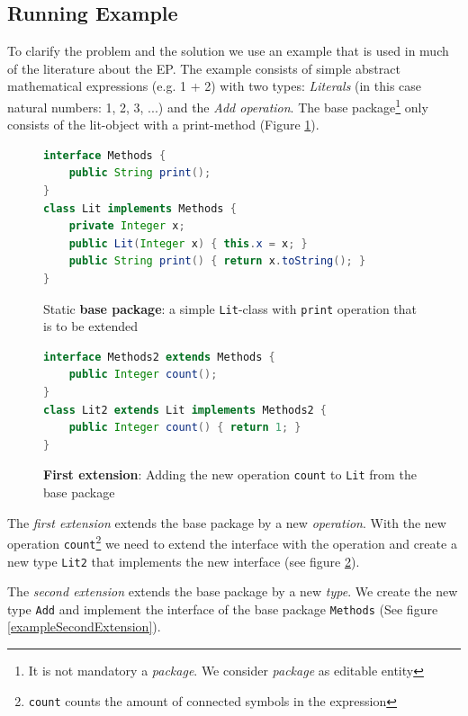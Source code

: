 \documentclass{report}
\begin{document}
\subsection{Running Example}
\label{example}

To clarify the problem and the solution we use an example that is used in much of the literature about the EP. The example consists of simple abstract mathematical expressions (e.g. 1 + 2) with two types: \emph{Literals} (in this case natural numbers: 1, 2, 3, ...) and the \emph{Add operation}. The base package\footnote{It is not mandatory a \emph{package}. We consider \emph{package} as editable entity} only consists of the lit-object with a print-method (Figure \ref{exampleLitBaseClass}).


\begin{figure}[H]
\begin{lstlisting}[language=java]
interface Methods {
    public String print();
}
class Lit implements Methods {
    private Integer x;
    public Lit(Integer x) { this.x = x; }
    public String print() { return x.toString(); }
}
\end{lstlisting}
\caption{Static \textbf{base package}: a simple \lstinline{Lit}-class with \lstinline{print} operation that is to be extended}
\label{exampleLitBaseClass}
\end{figure}
\begin{figure}[H]
\begin{lstlisting}[language=java]
interface Methods2 extends Methods {
    public Integer count();
}
class Lit2 extends Lit implements Methods2 {
    public Integer count() { return 1; }
}
\end{lstlisting}
\caption{\textbf{First extension}: Adding the new operation \lstinline{count} to \lstinline{Lit} from the base package}
\label{exampleFirstExtension}
\end{figure}

The \emph{first extension} extends the base package by a new \emph{operation}. With the new operation \lstinline{count}\footnote{\lstinline{count} counts the amount of connected symbols in the expression} we need to extend the interface with the operation and create a new type \lstinline{Lit2} that implements the new interface (see figure \ref{exampleFirstExtension}).

The \emph{second extension} extends the base package by a new \emph{type}. We create the new type \lstinline{Add} and implement the interface of the base package \lstinline{Methods} (See figure \ref{exampleSecondExtension}).
\end{document}
